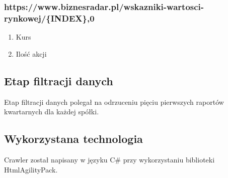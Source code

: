\subsubsection{https://www.biznesradar.pl/wskazniki-wartosci-rynkowej/\{INDEX\},0}
\begin{enumerate}
\item Kurs
\item Ilość akcji
\end{enumerate}

\subsection{Etap filtracji danych}
Etap filtracji danych polegał na odrzuceniu pięciu pierwszych raportów kwartarnych dla każdej spółki.

\subsection{Wykorzystana technologia}
Crawler został napisany w języku C\# przy wykorzystaniu biblioteki HtmlAgilityPack.